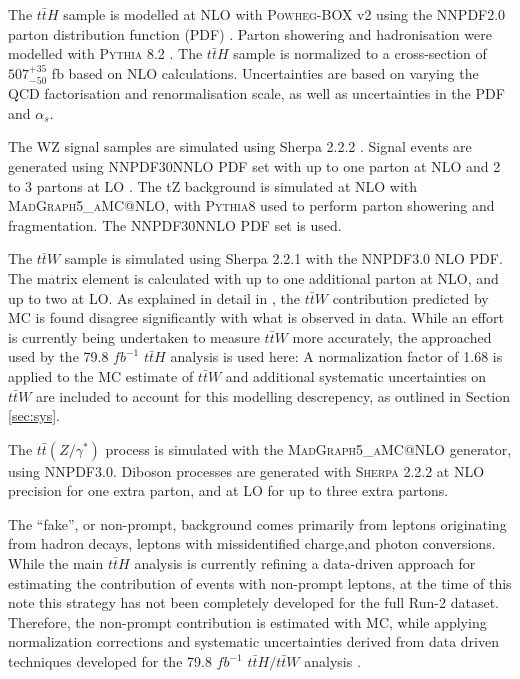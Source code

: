 The $t\bar{t}H$ sample is modelled at NLO with \textsc{Powheg-BOX} v2 using the NNPDF2.0 parton distribution function (PDF) \cite{ATL-PHYS-PUB-2015-011}. Parton showering and hadronisation were modelled with \textsc{Pythia} 8.2 \cite{ATL-PHYS-PUB-2011-009}. The $t\bar{t}H$ sample is normalized to a cross-section of $507^{+35}_{-50}$ fb based on NLO calculations. Uncertainties are based on varying the QCD factorisation and renormalisation scale, as well as uncertainties in the PDF and $\alpha_s$.

The WZ signal samples are simulated using Sherpa 2.2.2 \cite{sherpa}. Signal events are generated using NNPDF30NNLO PDF set with up to one parton at NLO and 2 to 3 partons at LO \cite{Ball:2014uwa}. The tZ background is simulated at NLO with \textsc{MadGraph5\_aMC@NLO}, with \textsc{Pythia8} used to perform parton showering and fragmentation. The NNPDF30NNLO PDF set is used.

The $t\bar{t}W$ sample is simulated using Sherpa 2.2.1 with the NNPDF3.0 NLO PDF. The matrix element is calculated with up to one additional parton at NLO, and up to two at LO. As explained in detail in \cite{ttH_paper}, the $t\bar{t}W$ contribution predicted by MC is found disagree significantly with what is observed in data. While an effort is currently being undertaken to measure $t\bar{t}W$ more accurately, the approached used by the 79.8 $fb^{-1}$ $t\bar{t}H$ analysis is used here: A normalization factor of 1.68 is applied to the MC estimate of $t\bar{t}W$ and additional systematic uncertainties on $t\bar{t}W$ are included to account for this modelling descrepency, as outlined in Section \ref{sec:sys}.

The $t\bar{t}(Z/\gamma^*)$ process is simulated with the \textsc{MadGraph5\_aMC@NLO} generator, using NNPDF3.0. Diboson processes are generated with \textsc{Sherpa} 2.2.2 at NLO precision for one extra parton, and at LO for up to three extra partons.

The ``fake'', or non-prompt, background comes primarily from leptons originating from hadron decays, leptons with missidentified charge,and photon conversions. While the main $t\bar{t}H$ analysis is currently refining a data-driven approach for estimating the contribution of events with non-prompt leptons, at the time of this note this strategy has not been completely developed for the full Run-2 dataset. Therefore, the non-prompt contribution is estimated with MC, while applying normalization corrections and systematic uncertainties derived from data driven techniques developed for the 79.8 $fb^{-1}$ $t\bar{t}H/t\bar{t}W$ analysis \cite{ttH_paper}. 

